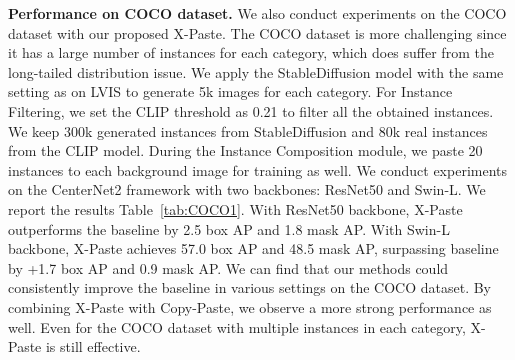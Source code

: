 \documentclass{article}
\begin{document}
\noindent \textbf{Performance on COCO dataset.} We also conduct experiments on the COCO dataset with our proposed X-Paste. The COCO dataset is more challenging since it has a large number of instances for each category, which does suffer from the long-tailed distribution issue. We apply the StableDiffusion model with the same setting as on LVIS to generate 5k images for each category. For Instance Filtering, we set the CLIP threshold as 0.21 to filter all the obtained instances. We keep 300k generated instances from StableDiffusion and 80k real instances from the CLIP model. During the Instance Composition module, we paste 20 instances to each background image for training as well. We conduct experiments on the CenterNet2 framework with two backbones: ResNet50 and Swin-L. We report the results Table~\ref{tab:COCO1}. With ResNet50 backbone, X-Paste outperforms the baseline by 2.5 box AP and 1.8 mask AP. With Swin-L backbone, X-Paste achieves 57.0 box AP and 48.5 mask AP, surpassing baseline by +1.7 box AP and 0.9 mask AP. We can find that our methods could consistently improve the baseline in various settings on the COCO dataset. By combining X-Paste with Copy-Paste, we observe a more strong performance as well. Even for the COCO dataset with multiple instances in each category, X-Paste is still effective.

\begin{table}[t]
  \small
  \centering
\caption{X-paste works well across a variety of different model architectures on the COCO dataset.}
\label{tab:COCO1}
\end{table}
\end{document}
